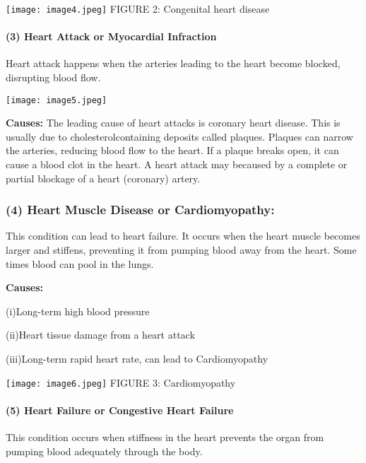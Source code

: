 \documentclass[
]{article}
\begin{document}
\texttt{[image: image4.jpeg]} FIGURE
2: Congenital heart disease

\hypertarget{heart-attack-or-myocardial-infraction}{%
\paragraph{(3) Heart Attack or Myocardial
Infraction}\label{heart-attack-or-myocardial-infraction}}

Heart attack happens when the arteries leading to the heart become
blocked, disrupting blood flow.

\texttt{[image: image5.jpeg]}

\textbf{Causes:} The leading cause of heart attacks is coronary heart
disease. This is usually due to cholesterolcontaining deposits called
plaques. Plaques can narrow the arteries, reducing blood flow to the
heart. If a plaque breaks open, it can cause a blood clot in the heart.
A heart attack may becaused by a complete or partial blockage of a heart
(coronary) artery.

\hypertarget{heart-muscle-disease-or-cardiomyopathy}{%
\subsubsection{(4) Heart Muscle Disease or
Cardiomyopathy:}\label{heart-muscle-disease-or-cardiomyopathy}}

This condition can lead to heart failure. It occurs when the heart
muscle becomes larger and stiffens, preventing it from pumping blood
away from the heart. Some times blood can pool in the lungs.

\textbf{Causes:}

(i)Long-term high blood pressure

(ii)Heart tissue damage from a heart attack

(iii)Long-term rapid heart rate, can lead to Cardiomyopathy

\texttt{[image: image6.jpeg]} FIGURE
3: Cardiomyopathy

\hypertarget{heart-failure-or-congestive-heart-failure}{%
\paragraph{(5) Heart Failure or Congestive Heart
Failure}\label{heart-failure-or-congestive-heart-failure}}

This condition occurs when stiffness in the heart prevents the organ
from pumping blood adequately through the body.
\end{document}
